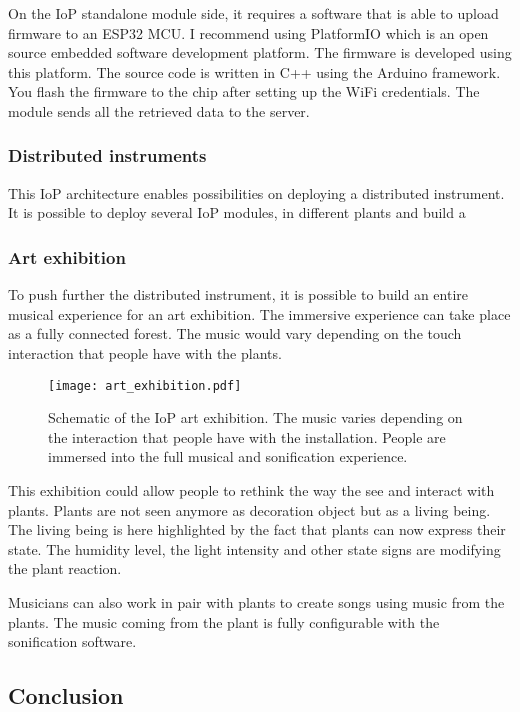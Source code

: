 On the IoP standalone module side, it requires a software that is able to upload 
firmware to an ESP32 MCU. I recommend using PlatformIO which is an open source 
embedded software development platform. The firmware is developed using this platform.
The source code is written in C++ using the Arduino framework. You flash the firmware
to the chip after setting up the WiFi credentials.
The module sends all the retrieved data to the server.

\subsubsection{Distributed instruments}

This IoP architecture enables possibilities on deploying a distributed instrument.
It is possible to deploy several IoP modules, in different plants and build a 

\subsubsection{Art exhibition}

To push further the distributed instrument, it is possible to build an entire 
musical experience for an art exhibition.
The immersive experience can take place as a fully connected forest. The music would vary
depending on the touch interaction that people have with the plants.

\begin{figure}[h!]
    \centering
    \texttt{[image: art\_exhibition.pdf]}
    \caption{Schematic of the IoP art exhibition. The music varies depending on the 
    interaction that people have with the installation. People are immersed into the full
    musical and sonification experience.} 
    \vspace{0.1cm}
    \label{fig:art_exhibition}
\end{figure}

This exhibition could allow people to rethink the way the see and interact with plants.
Plants are not seen anymore as decoration object but as a living being.
The living being is here highlighted by the fact that plants can now express their state.
The humidity level, the light intensity and other state signs are modifying the plant 
reaction.


Musicians can also work in pair with plants to create songs using music from the plants.
The music coming from the plant is fully configurable with the sonification software.


\subsection{Conclusion}

